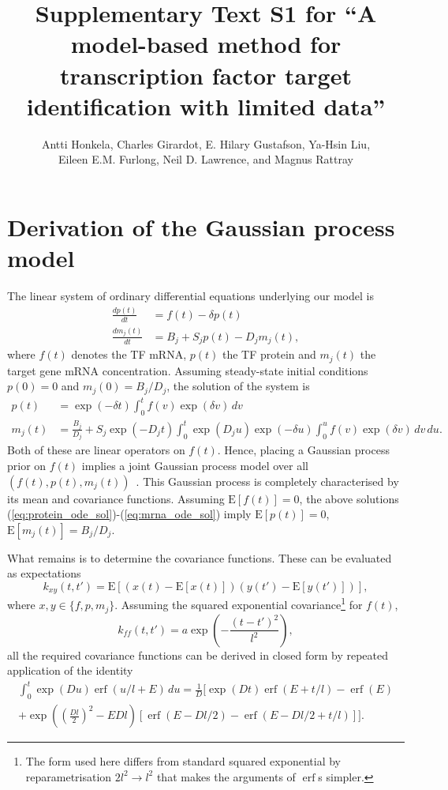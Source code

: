 \documentclass{article}
\title{Supplementary Text S1 for ``A model-based method for
  transcription factor target identification with limited data''}
\author{Antti Honkela, Charles Girardot, E. Hilary Gustafson, Ya-Hsin
  Liu,\\ Eileen E.M. Furlong, Neil D. Lawrence, and Magnus Rattray}
\date{}
\newcommand{\erf}{\operatorname{erf}}
\begin{document}
\maketitle

\section{Derivation of the Gaussian process model}

The linear system of ordinary differential equations underlying our model is
\begin{align}
  \label{eq:translation_ode}
  \frac{dp(t)}{dt} & = f(t) - \delta p(t) \\
  \label{eq:translation_ode}
  \frac{dm_j(t)}{dt} & = B_j + S_j p(t) - D_j m_j(t),
\end{align}
where $f(t)$ denotes the TF mRNA, $p(t)$ the
TF protein and $m_j(t)$ the target gene mRNA concentration.
Assuming steady-state initial conditions $p(0) = 0$ and
$m_j(0) = B_j / D_j$, the solution of the system is
\begin{align}
  \label{eq:protein_ode_sol}
  p(t) & = \exp(-\delta t) \int_0^t f(v) \exp(\delta v) \, dv \\
  \label{eq:mrna_ode_sol}
  m_j(t) & = \frac{B_j}{D_j} + S_j \exp(-D_j t) \int_0^t \exp(D_j
  u) \exp(-\delta u) \int_0^u f(v) \exp(\delta v) \, dv \, du.
\end{align}
Both of these are linear operators on $f(t)$.  Hence, placing a
Gaussian process prior on $f(t)$ implies a joint Gaussian process
model over all $(f(t), p(t), m_j(t))$~\cite{Rasmussen2006,Lawrence2007}.
This Gaussian process is completely characterised by its mean and
covariance functions.  Assuming $\mathrm{E}[f(t)] = 0$, the above
solutions (\ref{eq:protein_ode_sol})-(\ref{eq:mrna_ode_sol}) imply
$\mathrm{E}[p(t)] = 0$, $\mathrm{E}[m_j(t)] = B_j / D_j$.

What remains is to determine the covariance functions.  These can
be evaluated as expectations
\begin{equation}
  \label{eq:kernel_definition}
  k_{xy}(t,t') = \mathrm{E}[(x(t) - \mathrm{E}[x(t)])(y(t') - \mathrm{E}[y(t')])],
\end{equation}
where $x,y \in \{f, p, m_j\}$.  Assuming the squared exponential
covariance\footnote{The form used here differs from standard squared
  exponential by reparametrisation $2l^2 \rightarrow l^2$ that makes
  the arguments of $\erf$s simpler.} for $f(t)$,
\begin{equation}
  \label{eq:sqexp_kernel}
  k_{ff}(t, t') = a \exp\left( -\frac{(t-t')^2}{l^2} \right),
\end{equation}
all the required covariance functions can be derived in closed form
by repeated application of the identity
\begin{multline}
  \label{eq:gpsim_identity}
  \int_0^t \exp(D u) \erf(u/l + E)\,du =
  \frac{1}{D} \bigg[
  \exp(Dt) \erf(E + t/l) - \erf(E) \\
  + \exp\left(\left( \frac{Dl}{2}\right)^2 -E Dl \right)
  [ \erf(E - Dl/2) - \erf(E-Dl/2+t/l) ]
  \bigg].
\end{multline}
\end{document}
